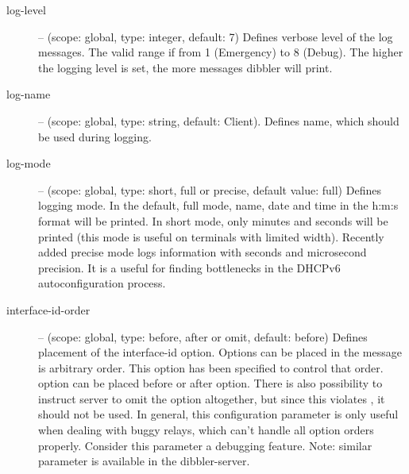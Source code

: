 \begin{description}
 \item[log-level] -- (scope: global, type: integer, default: 7) Defines
            verbose level of the log messages. The valid range if
            from 1 (Emergency) to 8 (Debug). The higher the logging
            level is set, the more messages dibbler will print.
 \item[log-name] -- (scope: global, type: string, default: Client). Defines
            name, which should be used during logging.
 \item[log-mode] -- (scope: global, type: short, full or precise,
            default value: full) Defines logging mode. In the
            default, full mode, name, date and time in the h:m:s format
            will be printed. In short mode, only minutes and
            seconds will be printed (this mode is useful on
            terminals with limited width). Recently added precise
            mode logs information with seconds and microsecond
            precision. It is a useful for finding bottlenecks in
            the DHCPv6 autoconfiguration process.
\item[interface-id-order] -- (scope: global, type: before, after or omit,
        default: before) Defines placement of the
        interface-id option. Options can be placed in the 
        message is arbitrary order. This option has been specified to control
        that order.  option can be placed before or after
         option. There is also possibility to instruct
        server to omit the  option altogether, but since
        this violates \cite{rfc3315}, it should not be used. In general, this
        configuration parameter is only useful when dealing with buggy relays,
        which can't handle all option orders properly. Consider this parameter
        a debugging feature. Note: similar parameter is available in the dibbler-server.


\end{description}
